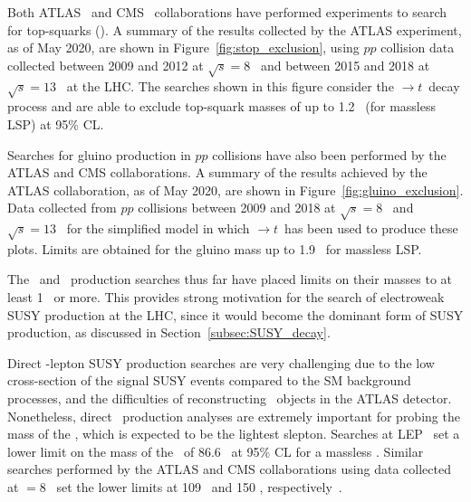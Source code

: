 	Both \ac{ATLAS}~\cite{stop0L,stop0LRun1,stopRun2} and \ac{CMS}~\cite{StopCMS1,StopCMS2} collaborations have performed experiments to search for top-squarks (\stop). 
	A summary of the results collected by the \ac{ATLAS} experiment, as of May 2020, are shown in Figure~\ref{fig:stop_exclusion}, using $pp$ collision data collected between 2009 and 2012 at $\sqrt{s}=8$ \tev\  and  between 2015 and 2018 at $\sqrt{s}=13$ \tev\  at the \ac{LHC}. The searches shown in this figure consider the \stopone$\rightarrow t$\ninoone\ decay process and are able to exclude top-squark masses of up to 1.2 \tev\ (for massless \ac{LSP}) at 95\% \ac{CL}. 
	\StopExclusion
	
	Searches for gluino production in $pp$ collisions have also been performed by the \ac{ATLAS} and \ac{CMS} collaborations.
	A summary of the results achieved by the \ac{ATLAS} collaboration, as of May 2020, are shown in Figure~\ref{fig:gluino_exclusion}. 
	Data collected from $pp$ collisions between 2009 and 2018 at $\sqrt{s}=8$ \tev\ and $\sqrt{s}=13$ \tev\ for the simplified model in which \gluino$\rightarrow t$\stop \ninoone\ has been used to produce these plots. 
	Limits are obtained for the gluino mass up to 1.9 \tev\ for massless \ac{LSP}.
	\GluinoExclusion
	
	The \stop\ and \gluino\ production searches thus far have placed limits on their masses to at least 1 \tev\ or more. 
	This provides strong motivation for the search of electroweak \ac{SUSY} production at the \ac{LHC}, since it would become the dominant form of \ac{SUSY} production, as discussed in Section~\ref{subsec:SUSY_decay}.
	
	Direct \stau -lepton  \ac{SUSY} production searches are very challenging due to the low cross-section of the signal \ac{SUSY} events compared to the \ac{SM} background processes, and the difficulties of reconstructing \ltau\ objects in the \ac{ATLAS} detector. 
	Nonetheless, direct \stau\ production analyses are extremely important for probing the mass of the \stau, which is expected to be the lightest slepton. Searches at \ac{LEP}~\cite{ACHARD200437} set a lower limit on the mass of the \stau\ of 86.6 \gev\ at 95\% \ac{CL} for a massless \ninoone. 
	Similar searches performed by the \ac{ATLAS} and \ac{CMS} collaborations using data collected at \com$=8$ \gev\ set the lower limits at 109 \gev\ and 150 \gev, respectively~\cite{PhysRevD.93.052002,CMSstauLimits,Sirunyan_2020}.
	
	
